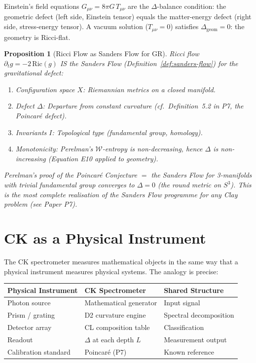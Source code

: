 \documentclass[12pt, openany]{book}
\newtheorem{proposition}[theorem]{Proposition}
\theoremstyle{remark}
\begin{document}
\noindent
Einstein's field equations $G_{\mu\nu} = 8\pi G\, T_{\mu\nu}$ are the
$\Delta$-balance condition: the geometric defect (left side, Einstein tensor)
equals the matter-energy defect (right side, stress-energy tensor).
A vacuum solution ($T_{\mu\nu} = 0$) satisfies $\Delta_{\mathrm{geom}} = 0$:
the geometry is Ricci-flat.

\begin{proposition}[Ricci Flow as Sanders Flow for GR]
\label{prop:ricci-sanders}
Ricci flow $\partial_t g = -2\,\mathrm{Ric}(g)$ IS the Sanders Flow
(Definition~\ref{def:sanders-flow}) for the gravitational defect:
\begin{enumerate}
  \item Configuration space $X$: Riemannian metrics on a closed manifold.
  \item Defect $\Delta$: Departure from constant curvature
        (cf.\ Definition~5.2 in P7, the Poincar\'e defect).
  \item Invariants $I$: Topological type (fundamental group, homology).
  \item Monotonicity: Perelman's $\mathcal{W}$-entropy is non-decreasing,
        hence $\Delta$ is non-increasing (Equation E10 applied to geometry).
\end{enumerate}
Perelman's proof of the Poincar\'e Conjecture $=$ the Sanders Flow for
3-manifolds with trivial fundamental group converges to $\Delta = 0$ (the
round metric on $S^3$).  This is the most complete realisation of the
Sanders Flow programme for any Clay problem (see Paper P7).
\end{proposition}


\section{CK as a Physical Instrument}
\label{sec:ck-instrument}

The CK spectrometer measures mathematical objects in the same way that a
physical instrument measures physical systems.  The analogy is precise:

\begin{center}
\begin{tabular}{@{}lll@{}}
\toprule
\textbf{Physical Instrument} & \textbf{CK Spectrometer} & \textbf{Shared Structure} \\
\midrule
Photon source & Mathematical generator & Input signal \\
Prism / grating & D2 curvature engine & Spectral decomposition \\
Detector array & CL composition table & Classification \\
Readout & $\Delta$ at each depth $L$ & Measurement output \\
Calibration standard & Poincar\'e (P7) & Known reference \\
\bottomrule
\end{tabular}
\end{center}
\end{document}
